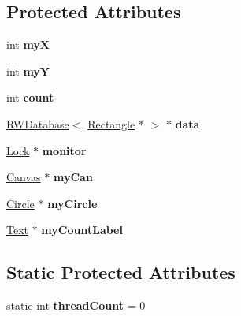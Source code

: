 \subsection*{Protected Attributes}
\begin{DoxyCompactItemize}
\item 
\mbox{\label{class_r_w_thread_a040c2e635a0871c60cb33a13f5379566}} 
int {\bfseries myX}
\item 
\mbox{\label{class_r_w_thread_a3a4a2a1cffb15e5c4f326fb5e076ab92}} 
int {\bfseries myY}
\item 
\mbox{\label{class_r_w_thread_a430c577265e1370f058afc24bf4f4d2e}} 
int {\bfseries count}
\item 
\mbox{\label{class_r_w_thread_ab2deb3d3e1a5f6a0d4fa50e0f9b9e3f4}} 
\hyperlink{class_r_w_database}{R\+W\+Database}$<$ \hyperlink{classtsgl_1_1_rectangle}{Rectangle} $\ast$ $>$ $\ast$ {\bfseries data}
\item 
\mbox{\label{class_r_w_thread_acefd6251a6c1f5b0b0fba22645fbe1da}} 
\hyperlink{class_lock}{Lock} $\ast$ {\bfseries monitor}
\item 
\mbox{\label{class_r_w_thread_a6be3c61accb2c1fa24b1125382de3a89}} 
\hyperlink{classtsgl_1_1_canvas}{Canvas} $\ast$ {\bfseries my\+Can}
\item 
\mbox{\label{class_r_w_thread_ab3259ce53de55087518c441716d80b54}} 
\hyperlink{classtsgl_1_1_circle}{Circle} $\ast$ {\bfseries my\+Circle}
\item 
\mbox{\label{class_r_w_thread_a8edb254652c7f05b2da8c22d7f73919c}} 
\hyperlink{classtsgl_1_1_text}{Text} $\ast$ {\bfseries my\+Count\+Label}
\end{DoxyCompactItemize}
\subsection*{Static Protected Attributes}
\begin{DoxyCompactItemize}
\item 
\mbox{\label{class_r_w_thread_a19724fd58e85c84f05af0fb4e422a44d}} 
static int {\bfseries thread\+Count} = 0
\end{DoxyCompactItemize}
